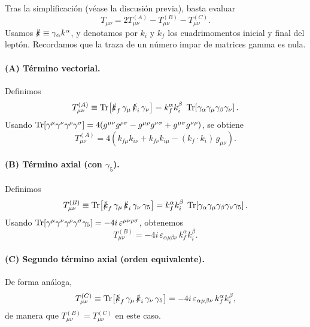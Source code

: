 Tras la simplificación (véase la discusión previa), basta evaluar
\begin{equation}
T_{\mu\nu}=2T_{\mu\nu}^{(A)}-T_{\mu\nu}^{(B)}-T_{\mu\nu}^{(C)}.
\label{eq:T_munu_reduced_ABC}
\end{equation}
Usamos \(\slashed{k}\equiv \gamma_\alpha k^\alpha\), y denotamos por \(k_i\) y \(k_f\)
los cuadrimomentos inicial y final del leptón. Recordamos que la traza de un número
impar de matrices gamma es nula.

\paragraph{(A) Término vectorial.}
Definimos
\begin{equation}
T_{\mu\nu}^{(A)} \equiv 
\Tr\!\left[\slashed{k}_f\,\gamma_\mu\,\slashed{k}_i\,\gamma_\nu\right]
= k_f^\alpha k_i^\beta\;\Tr\!\left[\gamma_\alpha\gamma_\mu\gamma_\beta\gamma_\nu\right].
\end{equation}
Usando
\(\Tr[\gamma^\mu\gamma^\nu\gamma^\rho\gamma^\sigma]
=4(g^{\mu\nu}g^{\rho\sigma}-g^{\mu\rho}g^{\nu\sigma}+g^{\mu\sigma}g^{\nu\rho})\),
se obtiene
\begin{equation}
T_{\mu\nu}^{(A)}
=4\left(k_{f\mu}k_{i\nu}+k_{f\nu}k_{i\mu}-(k_f\!\cdot\!k_i)\,g_{\mu\nu}\right).
\label{eq:TA_munu}
\end{equation}

\paragraph{(B) Término axial (con $\gamma_5$).}
Definimos
\begin{equation}
T_{\mu\nu}^{(B)} \equiv 
\Tr\!\left[\slashed{k}_f\,\gamma_\mu\,\slashed{k}_i\,\gamma_\nu\,\gamma_5\right]
= k_f^\alpha k_i^\beta\;\Tr\!\left[\gamma_\alpha\gamma_\mu\gamma_\beta\gamma_\nu\gamma_5\right].
\end{equation}
Usando
\(\Tr[\gamma^\mu\gamma^\nu\gamma^\rho\gamma^\sigma\gamma_5]
=-4i\,\varepsilon^{\mu\nu\rho\sigma}\),
obtenemos
\begin{equation}
T_{\mu\nu}^{(B)}=-4i\,\varepsilon_{\alpha\mu\beta\nu}\,k_f^\alpha k_i^\beta.
\label{eq:TB_munu}
\end{equation}

\paragraph{(C) Segundo término axial (orden equivalente).}
De forma análoga,
\begin{equation}
T_{\mu\nu}^{(C)} \equiv 
\Tr\!\left[\slashed{k}_f\,\gamma_\mu\,\slashed{k}_i\,\gamma_\nu\,\gamma_5\right]
=-4i\,\varepsilon_{\alpha\mu\beta\nu}\,k_f^\alpha k_i^\beta,
\label{eq:TC_munu}
\end{equation}
de manera que \(T_{\mu\nu}^{(B)}=T_{\mu\nu}^{(C)}\) en este caso.

